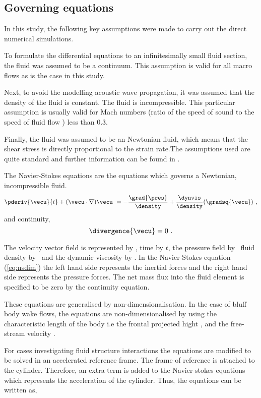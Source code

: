 \subsection{Governing equations}
 
  In this study, the following key assumptions were made to carry out the direct numerical simulations. 
 
 To formulate the differential equations to an infinitesimally small fluid section, the fluid was assumed to be a continuum. This assumption is valid for all macro flows as  is the case in this study. 
 
 
 Next, to avoid the modelling acoustic wave propagation, it was assumed that the density of the fluid is constant. The fluid is incompressible. This particular assumption is usually valid for Mach numbers (ratio of the speed of sound to the speed of fluid flow ) less than 0.3.
 
 Finally, the fluid was assumed to be an Newtonian fluid, which means that the shear stress is directly proportional to the strain rate.The assumptions used are quite standard and further information can be found in \citet{White99}.        

The Navier-Stokes equations are the equations which governs a Newtonian, incompressible fluid.
  \begin{equation} \centering
  \label{eq:nsdim}
  \pderiv{\vecu}{t} + (\vecu\cdot\nabla)\vecu\ = -\frac{\grad{\pres}}{\density} + \frac{\dynvis}{\density}(\gradsq{\vecu})~,
  \end{equation}
  and continuity,
  \begin{equation} \centering
  \divergence{\vecu} = 0~.
  \end{equation}
  
  The velocity vector field is represented by \vecu, time by $t$, the pressure field by \pres \ fluid density by \density \ and the dynamic viscosity by \dynvis. In the Navier-Stokes equation (\ref{eq:nsdim}) the left hand side represents the inertial forces and the right hand side represents the pressure forces. The net mass flux into the fluid element is specified to be zero by the continuity equation. 
  
  These equations are generalised by non-dimensionalisation. In the case of bluff body wake flows, the equations are non-dimensionalised by using the characteristic length of the body i.e the frontal projected hight \diam, and the free-stream velocity \Ufree. 
  
  For cases investigating fluid structure interactions the equations are modified  to  be solved in an accelerated reference frame. The frame of reference is attached to the cylinder. Therefore, an extra term is added to the Navier-stokes equations which represents the acceleration of the cylinder. Thus, the equations can be written as, 
  
